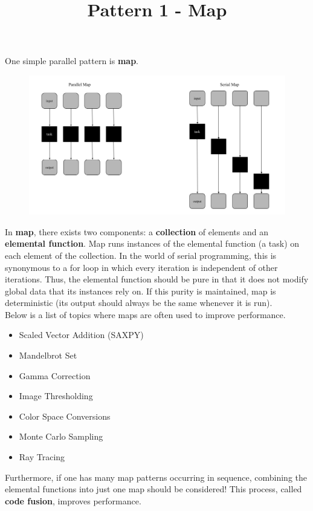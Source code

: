 \documentclass{article}
\title{Pattern 1 - Map}
\date{ }
\begin{document}
\maketitle

    One simple parallel pattern is \textbf{map}.  
\begin{figure}[H]
    \centering
    \includegraphics[width=1\linewidth]{Map Diagram.png}
\end{figure}
    In \textbf{map}, there exists two components: a \textbf{collection} of elements and an \textbf{elemental function}. Map runs instances of the elemental function (a task) on each element of the collection. In the world of serial programming, this is synonymous to a for loop in which every iteration is independent of other iterations. Thus, the elemental function should be pure in that it does not modify global data that its instances rely on. If this purity is maintained, map is deterministic (its output should always be the same whenever it is run). \\
    
    Below is a list of topics where maps are often used to improve performance. 
\begin{itemize}
  \item Scaled Vector Addition (SAXPY)
  \item Mandelbrot Set
  \item Gamma Correction
  \item Image Thresholding
  \item Color Space Conversions
  \item Monte Carlo Sampling
  \item Ray Tracing \\
\end{itemize}

    Furthermore, if one has many map patterns occurring in sequence, combining the elemental functions into just one map should be considered! This process, called \textbf{code fusion}, improves performance. 
    
\end{document}

